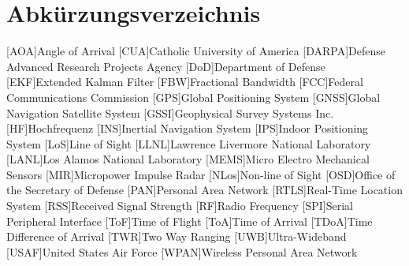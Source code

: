 \chapter*{Abkürzungsverzeichnis}
\begin{acronym}
		
	[AOA]{Angle of Arrival}
	[CUA]{Catholic University of America}
	[DARPA]{Defense Advanced Research Projects Agency}
	[DoD]{Department of Defense}
	[EKF]{Extended Kalman Filter}
	[FBW]{Fractional Bandwidth}
	[FCC]{Federal Communications Commission}
	[GPS]{Global Positioning System}
	[GNSS]{Global Navigation Satellite System}
	[GSSI]{Geophysical Survey Systems Inc.}
	[HF]{Hochfrequenz}
	[INS]{Inertial Navigation System}
	[IPS]{Indoor Positioning System}
	[LoS]{Line of Sight}
	[LLNL]{Lawrence Livermore National Laboratory}
	[LANL]{Los Alamos National Laboratory}
	[MEMS]{Micro Electro Mechanical Sensors}
	[MIR]{Micropower Impulse Radar}
	[NLos]{Non-line of Sight}
	[OSD]{Office of the Secretary of Defense}
	[PAN]{Personal Area Network}
	[RTLS]{Real-Time Location System}
	[RSS]{Received Signal Strength}
	[RF]{Radio Frequency}
	[SPI]{Serial Peripheral Interface}
	[ToF]{Time of Flight}
	[ToA]{Time of Arrival}
	[TDoA]{Time Difference of Arrival}
	[TWR]{Two Way Ranging}
	[UWB]{Ultra-Wideband} %
	[USAF]{United States Air Force}
	[WPAN]{Wireless Personal Area Network}

\end{acronym}